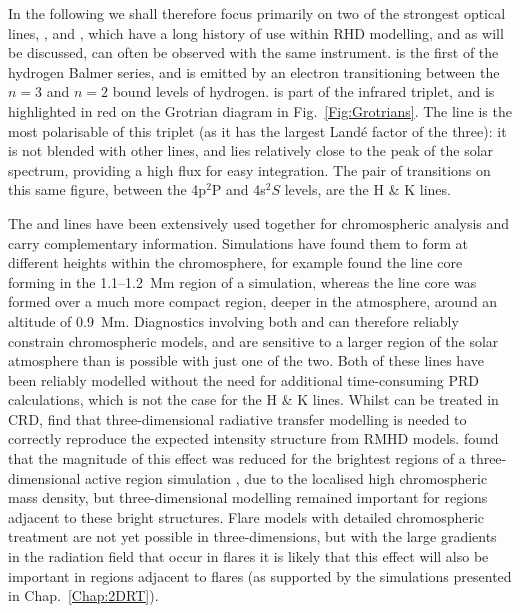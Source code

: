 In the following we shall therefore focus primarily on two of the strongest optical lines, \Ha{}, and \CaLine{}, which have a long history of use within RHD modelling, and as will be discussed, can often be observed with the same instrument.
\Ha{} is the first of the hydrogen Balmer series, and is emitted by an electron transitioning between the $n=3$ and $n=2$ bound levels of hydrogen.
\CaLine{} is part of the \Caii{} infrared triplet, and is highlighted in red on the Grotrian diagram in Fig.~\ref{Fig:Grotrians}.
The \CaLine{} line is the most polarisable of this triplet (as it has the largest Landé factor of the three): it is not blended with other lines, and lies relatively close to the peak of the solar spectrum, providing a high flux for easy integration.
The pair of transitions on this same figure, between the 4p$^2$P and 4s$^2S$ levels, are the \Caii{} H \& K lines.

The \Ha{} and \CaLine{} lines have been extensively used together for chromospheric analysis and carry complementary information.
Simulations have found them to form at different heights within the chromosphere, for example \citet{Kuridze2015} found the \Ha{} line core forming in the 1.1--\SI{1.2}{\mega\metre} region of a \Radyn{} simulation, whereas the \CaLine{} line core was formed over a much more compact region, deeper in the atmosphere, around an altitude of \SI{0.9}{\mega\m}.
Diagnostics involving both \Ha{} and \CaLine{} can therefore reliably constrain chromospheric models, and are sensitive to a larger region of the solar atmosphere than is possible with just one of the two.
Both of these lines have been reliably modelled without the need for additional time-consuming PRD calculations, which is not the case for the \Caii{} H \& K lines.
Whilst \Ha{} can be treated in CRD, \citet{Leenaarts2012a} find that three-dimensional radiative transfer modelling is needed to correctly reproduce the expected intensity structure from RMHD models.
\citet{Bjorgen2019} found that the magnitude of this effect was reduced for the brightest regions of a three-dimensional active region simulation \citep{Cheung2019}, due to the localised high chromospheric mass density, but three-dimensional modelling remained important for regions adjacent to these bright structures.
Flare models with detailed chromospheric treatment are not yet possible in three-dimensions, but with the large gradients in the radiation field that occur in flares it is likely that this effect will also be important in regions adjacent to flares (as supported by the simulations presented in Chap.~\ref{Chap:2DRT}).


